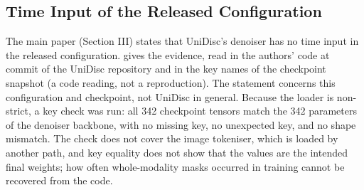\documentclass[journal,onecolumn]{IEEEtran}
\theoremstyle{plain}
\begin{document}
\subsection{Time Input of the Released Configuration}\label{sup:timefree}
The main paper (Section III) states that UniDisc's denoiser has no time input in the released configuration.
 gives the evidence, read in the authors' code at commit
\texttt{} of the UniDisc repository and in the key names of the checkpoint snapshot
\texttt{} (a code reading, not a reproduction).
The statement concerns this configuration and checkpoint, not UniDisc in general.
Because the loader is non-strict, a key check was run: all 342 checkpoint tensors match the 342 parameters of the denoiser backbone, with
no missing key, no unexpected key, and no shape mismatch.
The check does not cover the image tokeniser, which is loaded by another path, and key equality does not show that the values are the
intended final weights; how often whole-modality masks occurred in training cannot be recovered from the code.
\end{document}
